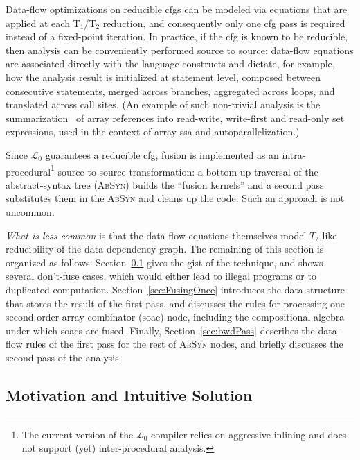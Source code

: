 \documentclass{sigplanconf}  %
\newcommand{\LO}{$\mathcal{L}_0$}
\begin{document}
Data-flow optimizations on reducible {\sc cfg}s can be modeled via equations 
that are applied at each T$_1$/T$_2$ reduction, and consequently only one
{\sc cfg} pass is required instead of a fixed-point iteration.
%
In practice, if the {\sc cfg} is known to be reducible, then 
analysis can be conveniently performed source to source: 
data-flow equations are associated directly with the
language constructs and dictate, for example, how the analysis result is
initialized at statement level, composed between consecutive statements,
merged across branches, aggregated across loops, and translated across 
call sites.  (An example of such non-trivial 
analysis is the summarization~\cite{HybAn} of array references into 
read-write, write-first and read-only set expressions, used in the context 
of array-{\sc ssa} and autoparallelization.)
 
Since \LO{} guarantees a reducible {\sc cfg}, %
fusion is implemented as an intra-procedural\footnote{
The current version of the \LO{} compiler 
relies on aggressive inlining and does not support
(yet) inter-procedural analysis.
}
source-to-source transformation: a bottom-up traversal of the 
abstract-syntax tree (\textsc{AbSyn}) builds the ``fusion kernels'' 
and a second pass substitutes them in the \textsc{AbSyn} and 
cleans up the code.    Such an approach is not uncommon. 

{\em What is less common} is that the data-flow equations 
themselves model $T_2$-like reducibility of the data-dependency graph.
The remaining of this section is organized as follows:
Section~\ref{sec:Intuition} gives the gist of the technique,
and shows several don't-fuse cases, which would
either lead to illegal programs or to duplicated computation.
%
Section~\ref{sec:FusingOnce} introduces the data structure
that stores the result of the first pass, and discusses the rules 
for processing one second-order array combinator ({\sc soac}) node, 
including the compositional algebra under which {\sc soac}s are fused. 
Finally, Section~\ref{sec:bwdPass} describes the data-flow rules of
the first pass for the rest of \textsc{AbSyn} nodes, and briefly 
discusses the second pass of the analysis.

\subsection{Motivation and Intuitive Solution}
\label{sec:Intuition}
\end{document}
